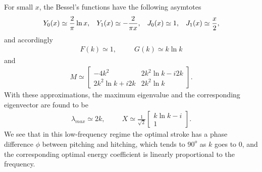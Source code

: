 For small $x$, the Bessel's functions have the following asymtotes
\begin{align}
Y_0(x)  \simeq  \frac{2}{\pi} \ln x,  \hspace{3mm} 
Y_1(x)  \simeq  -\frac{2}{\pi x}, \hspace{3mm}
J_0(x) \simeq 1, \hspace{3mm}
J_1(x) \simeq \frac{x}{2},
\end{align}
and accordingly
\begin{align}
F(k) \simeq 1,  \hspace{30pt}   G(k) \simeq k \ln k
\end{align}
and
\begin{align}
M \simeq \begin{bmatrix} 
-4k^2   &  2k^2 \ln k - i2k  \\
2k^2 \ln k + i2k  &   2k^2 \ln k 
\end{bmatrix}.
\end{align}
With these approximations, the maximum eigenvalue and the corresponding eigenvector are found to be
\begin{align}
\lambda_{max} \simeq 2k,   \hspace{1cm}
X \simeq   \frac{1}{\sqrt{2}}
\begin{bmatrix} k \ln k - i \\  1   \end{bmatrix}.
\end{align}
We see that in this low-frequency regime the optimal stroke has a phase difference $\phi$ between pitching and hitching, which tends to $90^o$ as $k$ goes to 0, and the corresponding optimal energy coefficient is linearly proportional to the frequency.

